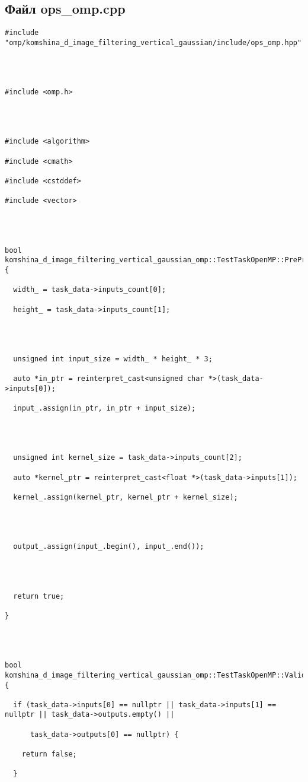 \documentclass[12pt]{article}
\begin{document}
\subsection*{Файл ops\_omp.cpp}
\begin{lstlisting}
#include "omp/komshina_d_image_filtering_vertical_gaussian/include/ops_omp.hpp"




#include <omp.h>




#include <algorithm>

#include <cmath>

#include <cstddef>

#include <vector>




bool komshina_d_image_filtering_vertical_gaussian_omp::TestTaskOpenMP::PreProcessingImpl() {

  width_ = task_data->inputs_count[0];

  height_ = task_data->inputs_count[1];




  unsigned int input_size = width_ * height_ * 3;

  auto *in_ptr = reinterpret_cast<unsigned char *>(task_data->inputs[0]);

  input_.assign(in_ptr, in_ptr + input_size);




  unsigned int kernel_size = task_data->inputs_count[2];

  auto *kernel_ptr = reinterpret_cast<float *>(task_data->inputs[1]);

  kernel_.assign(kernel_ptr, kernel_ptr + kernel_size);




  output_.assign(input_.begin(), input_.end());




  return true;

}




bool komshina_d_image_filtering_vertical_gaussian_omp::TestTaskOpenMP::ValidationImpl() {

  if (task_data->inputs[0] == nullptr || task_data->inputs[1] == nullptr || task_data->outputs.empty() ||

      task_data->outputs[0] == nullptr) {

    return false;

  }





\end{lstlisting}
\end{document}
